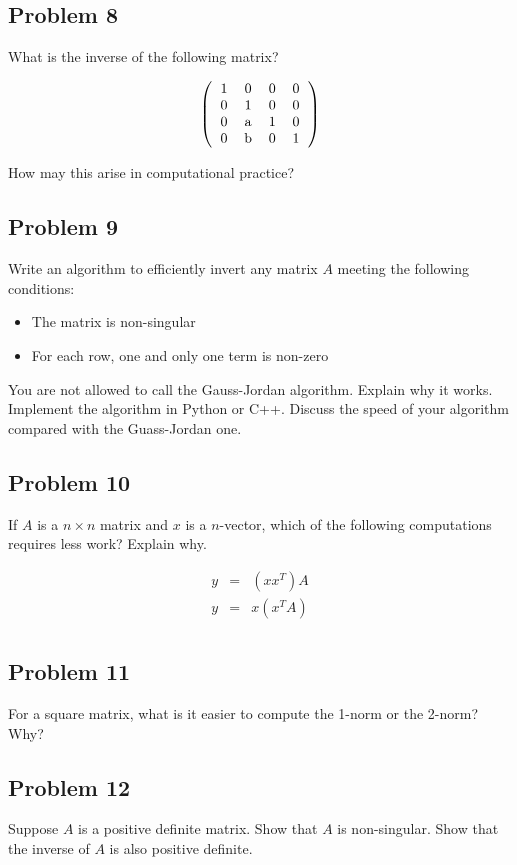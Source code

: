 \documentclass[12pt]{article}
\begin{document}
\subsection{Problem 8}

What is the inverse of the following matrix?

\[
\left(
\begin{tabular}{cccc}
1 & 0 & 0 & 0 \\
0 & 1 & 0 & 0 \\
0 & a & 1 & 0 \\
0 & b & 0 & 1 \\
\end{tabular}
\right)
\]

How may this arise in computational practice?

\subsection{Problem 9}

Write an algorithm to efficiently invert any matrix $A$ meeting the following conditions:
\begin{itemize}
\item The matrix is non-singular
\item For each row, one and only one term is non-zero
\end{itemize}
You are not allowed to call the Gauss-Jordan algorithm.
Explain why it works. Implement the algorithm in Python or C++.
Discuss the speed of your algorithm compared with the Guass-Jordan one.

\subsection{Problem 10}
 If $A$ is a $n\times n$ matrix and $x$ is a $n$-vector, which of the following computations requires less work? Explain why.

\begin{eqnarray}
y &=& (x x^T)A \\
y &=& x (x^T A) \\
\end{eqnarray}

\subsection{Problem 11}

For a square matrix, what is it easier to compute the 1-norm or the 2-norm? Why?

\subsection{Problem 12}

Suppose $A$ is a positive definite matrix.  Show that $A$ is non-singular. Show that the inverse of $A$ is also positive definite.
\end{document}
